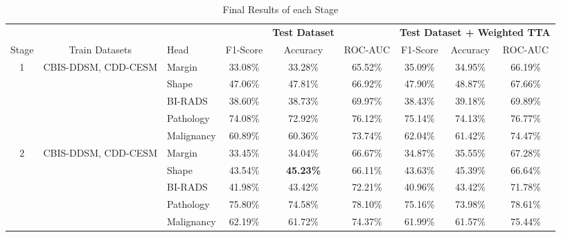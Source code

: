\documentclass[11pt,a4paper]{article}
\begin{document}
\begin{table}[!ht]
    \centering
    \small
    \caption{Final Results of each Stage}
\begin{adjustbox}{width=\textwidth}
\begin{tabular}{cclcccccc}
\toprule
& &  & &\multicolumn{1}{c}{\textbf{Test Dataset}} 
& &  \multicolumn{3}{c}{\textbf{Test Dataset + Weighted TTA}} \\
Stage                        & Train Datasets                                    & Head       & F1-Score & Accuracy & ROC-AUC & F1-Score & Accuracy & ROC-AUC \\
\cmidrule(lr){4-6}\cmidrule(lr){7-9}
\multirow{5}{*}{1}           & \multirow{5}{*}{CBIS-DDSM, CDD-CESM}              & Margin     & 33.08\%  & 33.28\%  & 65.52\% & 35.09\% & 34.95\% & 66.19\% \\
                             &                                                   & Shape      & 47.06\%  & 47.81\%  & 66.92\% & 47.90\% & 48.87\% & 67.66\% \\
                             &                                                   & BI-RADS    & 38.60\%  & 38.73\%  & 69.97\% & 38.43\% & 39.18\% & 69.89\% \\
                             &                                                   & Pathology  & 74.08\%  & 72.92\%  & 76.12\% & 75.14\% & 74.13\% & 76.77\% \\
                             &                                                   & Malignancy & 60.89\%  & 60.36\%  & 73.74\% & 62.04\% & 61.42\% & 74.47\% \\
\midrule
\multirow{5}{*}{2}           & \multirow{5}{*}{CBIS-DDSM, CDD-CESM}              & Margin     & 33.45\%  & 34.04\%  & 66.67\% & 34.87\% & 35.55\% & 67.28\% \\
                             &                                                   & Shape      & 43.54\%  & \textbf{45.23\%}  & 66.11\% & 43.63\% & 45.39\% & 66.64\% \\
                             &                                                   & BI-RADS    & 41.98\%  & 43.42\%  & 72.21\% & 40.96\% & 43.42\% & 71.78\% \\
                             &                                                   & Pathology  & 75.80\%  & 74.58\%  & 78.10\% & 75.16\% & 73.98\% & 78.61\% \\
                             &                                                   & Malignancy & 62.19\%  & 61.72\%  & 74.37\% & 61.99\% & 61.57\% & 75.44\% \\

\end{tabular}
\end{adjustbox}
\end{table}
\end{document}
